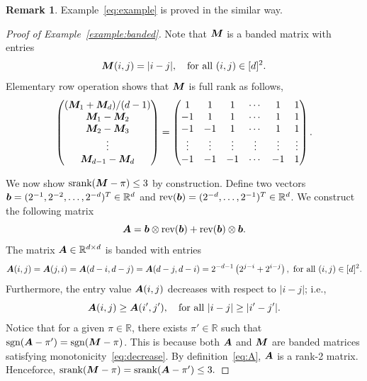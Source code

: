\documentclass[twoside,11pt]{article}
\theoremstyle{definition}
\newtheorem{rmk}{Remark}
\def\sign{\textup{sgn}}
\def\srank{\textup{srank}}
\begin{document}
\begin{rmk}
Example~\ref{eq:example} is proved in the similar way.
\end{rmk}




\begin{proof}[Proof of Example~\ref{example:banded}]
Note that $\bm M$ is a banded matrix with entries
\[
\bm M(i,j)={|i-j|}, \quad \text{for all }(i,j)\in[d]^2.
\]
Elementary row operation shows that $\bm M$ is full rank as follows,
\begin{align}
\begin{pmatrix}
(\bm M_1+\bm M_d)/(d-1)\\
\bm M_1-\bm M_2\\
\bm M_2-\bm M_3\\
\vdots\\
\bm M_{d-1}-\bm M_{d}
\end{pmatrix} = 
\begin{pmatrix}
1&1&1&\cdots&1&1\\
-1&1&1&\cdots&1&1\\
-1&-1&1&\cdots&1&1\\
\vdots & \vdots & \vdots & \vdots & \vdots & \vdots\\
-1&-1&-1&\cdots&-1&1
\end{pmatrix}.
\end{align}

We now show $\srank(\mM-\pi)\leq 3$ by construction. Define two vectors $\bm{b}=(2^{-1},2^{-2},\ldots,2^{-d})^T\in\mathbb{R}^d$ and $\text{rev}(\bm{b})=(2^{-d},\ldots,2^{-1})^T\in\mathbb{R}^d$. We construct the following matrix
\begin{equation}\label{eq:A}
\bm A=\bm{b}\otimes\text{rev}(\bm{b})+\text{rev}(\bm{b})\otimes\bm{b}.
\end{equation}
The matrix $\bm A\in\mathbb{R}^{d\times d}$ is banded with entries
\[
\mA(i,j)=\mA(j,i)=\mA(d-i,d-j)=\mA(d-j,d-i)=2^{-d-1}\left(2^{j-i}+2^{i-j}\right),\ \text{for all }(i,j)\in[d]^2.
\] 
Furthermore, the entry value $\bm A(i,j)$ decreases with respect to $|i-j|$; i.e., 
\begin{equation}\label{eq:decrease}
\bm A(i,j) \geq \bm A(i',j'), \quad \text{for all }|i-j|\geq |i'-j'|.
\end{equation}
Notice that for a given $\pi\in\mathbb{R}$, there exists $\pi'\in\mathbb{R}$ such that $\sign(\mA-\pi')=\sign(\mM-\pi)$. This is because both $\bm A$ and $\bm M$ are banded matrices satisfying monotonicity~\eqref{eq:decrease}. By definition~\eqref{eq:A}, $\bm A$ is a rank-2 matrix. Henceforce, $\srank(\mM-\pi)=\srank(\mA-\pi')\leq 3.$
\end{proof}
\end{document}
